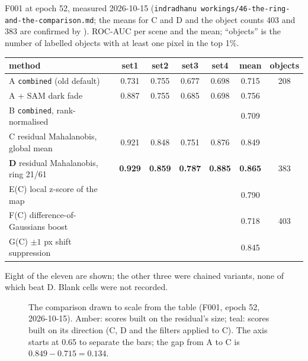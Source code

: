 \begin{drift}
F001 at epoch 52, measured 2026-10-15 (\texttt{indradhanu workings/46-the-ring-and-the-comparison.md}; the means
for C and D and the object counts 403 and 383 are confirmed by ). ROC-AUC
per scene and the mean; ``objects'' is the number of labelled objects with at least one pixel in the top 1\%.
\begin{center}\small
\begin{tabular}{@{}lcccccc@{}}
\toprule
method & set1 & set2 & set3 & set4 & mean & objects\\
\midrule
A \texttt{combined} (old default) & 0.731 & 0.755 & 0.677 & 0.698 & 0.715 & 208\\
A + SAM dark fade & 0.887 & 0.755 & 0.685 & 0.698 & 0.756 & \\
B \texttt{combined}, rank-normalised & & & & & 0.709 & \\
C residual Mahalanobis, global mean & 0.921 & 0.848 & 0.751 & 0.876 & 0.849 & \\
\textbf{D} residual Mahalanobis, ring 21/61 & \textbf{0.929} & \textbf{0.859} & \textbf{0.787} & \textbf{0.885} & \textbf{0.865} & 383\\
E(C) local z-score of the map & & & & & 0.790 & \\
F(C) difference-of-Gaussians boost & & & & & 0.718 & 403\\
G(C) $\pm1$ px shift suppression & & & & & 0.845 & \\
\bottomrule
\end{tabular}
\end{center}
Eight of the eleven are shown; the other three were chained variants, none of which beat D. Blank cells were
not recorded.
\end{drift}

\begin{figure}[htbp]\centering
{}
\caption{The comparison drawn to scale from the table (F001, epoch 52, 2026-10-15). Amber: scores built on the
residual's size; teal: scores built on its direction (C, D and the filters applied to C). The axis starts at
0.65 to separate the bars; the gap from A to C is $0.849-0.715=0.134$.}\label{fig:residualmaha:bars}
\end{figure}

